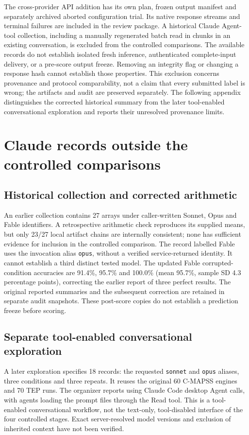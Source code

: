 \documentclass[11pt,a4paper]{article}
\begin{document}
The cross-provider API addition has its own plan, frozen output manifest and separately archived aborted configuration trial. Its native response streams and terminal failures are included in the review package. A historical Claude Agent-tool collection, including a manually regenerated batch read in chunks in an existing conversation, is excluded from the controlled comparisons. The available records do not establish isolated fresh inference, authenticated complete-input delivery, or a pre-score output freeze. Removing an integrity flag or changing a response hash cannot establish those properties. This exclusion concerns provenance and protocol comparability, not a claim that every submitted label is wrong; the artifacts and audit are preserved separately. The following appendix distinguishes the corrected historical summary from the later tool-enabled conversational exploration and reports their unresolved provenance limits.

\FloatBarrier
\section{Claude records outside the controlled comparisons}
\label{app:claude_reported}
\subsection{Historical collection and corrected arithmetic}
An earlier collection contains 27 arrays under caller-written Sonnet, Opus and Fable identifiers. A retrospective arithmetic check reproduces its supplied means, but only 23/27 local artifact chains are internally consistent; none has sufficient evidence for inclusion in the controlled comparison. The record labelled Fable uses the invocation alias \texttt{opus}, without a verified service-returned identity. It cannot establish a third distinct tested model. The updated Fable corrupted-condition accuracies are 91.4\%, 95.7\% and 100.0\% (mean 95.7\%, sample SD 4.3 percentage points), correcting the earlier report of three perfect results. The original reported summaries and the subsequent correction are retained in separate audit snapshots. These post-score copies do not establish a prediction freeze before scoring.

\subsection{Separate tool-enabled conversational exploration}
A later exploration specifies 18 records: the requested \texttt{sonnet} and \texttt{opus} aliases, three conditions and three repeats. It reuses the original 60 C-MAPSS engines and 70 TEP runs. The organizer reports using Claude Code desktop Agent calls, with agents loading the prompt files through the Read tool. This is a tool-enabled conversational workflow, not the text-only, tool-disabled interface of the four controlled stages. Exact server-resolved model versions and exclusion of inherited context have not been verified.
\end{document}
